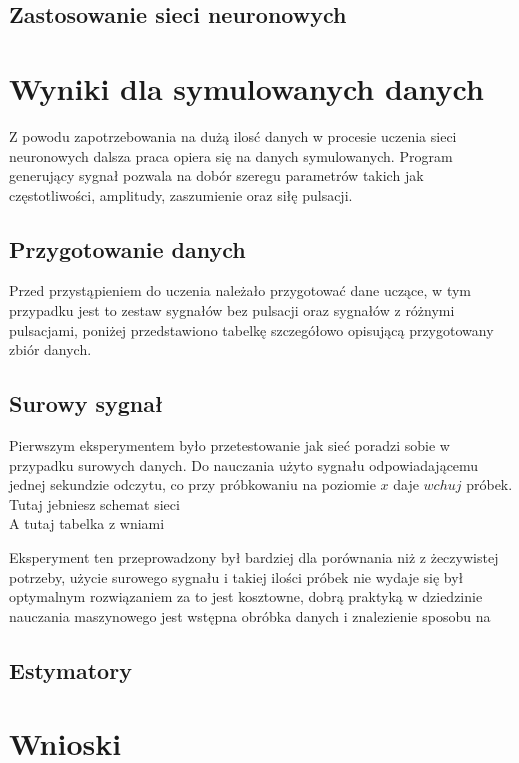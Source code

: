 \documentclass[12pt, a4paper, oneside, draft]{article}
\begin{document}
	\subsection{Zastosowanie sieci neuronowych}
	
	
	
	\cite{Wylomanska01}
	
	
	
	\section{Wyniki dla symulowanych danych}
	Z powodu zapotrzebowania na dużą ilosć danych w procesie uczenia sieci neuronowych dalsza praca opiera się na danych symulowanych. Program generujący sygnał pozwala na dobór szeregu parametrów takich jak częstotliwości, amplitudy, zaszumienie oraz siłę pulsacji.
	\subsection{Przygotowanie danych}
	Przed przystąpieniem do uczenia należało przygotować dane uczące, w tym przypadku jest to zestaw sygnałów bez pulsacji oraz sygnałów z różnymi pulsacjami, poniżej przedstawiono tabelkę szczegółowo opisującą przygotowany zbiór danych.
	\subsection{Surowy sygnał}
	Pierwszym eksperymentem było przetestowanie jak sieć poradzi sobie w przypadku surowych danych. Do nauczania użyto sygnału odpowiadającemu jednej sekundzie odczytu, co przy próbkowaniu na poziomie $x$ daje $w chuj$ próbek.
	\\ Tutaj jebniesz schemat sieci
	\\A tutaj tabelka z wniami 
	
	Eksperyment ten przeprowadzony był bardziej dla porównania niż z żeczywistej potrzeby, użycie surowego sygnału i takiej ilości próbek nie wydaje się był optymalnym rozwiązaniem za to jest kosztowne, dobrą praktyką w dziedzinie nauczania maszynowego jest wstępna obróbka danych i znalezienie sposobu na 
	
	\subsection{Estymatory}
	
	\section{Wnioski}
	
	
	
	\begin{center}
	\end{center}
	
	
	
\end{document}
